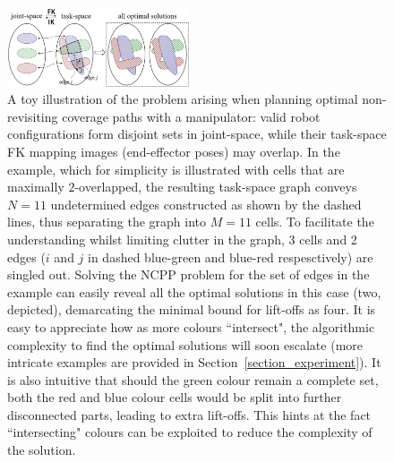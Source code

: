 \documentclass[conference]{IEEEtran}
\begin{document}
\begin{figure}[t]
\centering
\includegraphics[width = 0.48\textwidth]{figures/mapping_2}
\caption{A toy illustration of the problem arising when planning optimal non-revisiting coverage paths with a manipulator: valid robot configurations form disjoint sets in joint-space, while their task-space FK mapping images (end-effector poses) may overlap. 
In the example, which for simplicity is illustrated with cells that are maximally $2$-overlapped, the resulting task-space graph 
conveys $N = 11$ undetermined edges constructed as shown by the dashed lines, thus separating the graph into $M = 11$ cells.
To facilitate the understanding whilst limiting clutter in the graph, 3 cells and 2 edges ($i$ and $j$ in dashed blue-green and blue-red respesctively) are singled out.
Solving the NCPP problem for the set of edges in the example can easily reveal all the optimal solutions in this case (two, depicted), demarcating the minimal bound for lift-offs as four. 
It is easy to appreciate how as more colours ``intersect", the algorithmic complexity to find the optimal solutions will soon escalate (more intricate examples are provided in Section~\ref{section_experiment}). 
It is also intuitive that should the green colour remain a complete set, both the red and blue colour cells would be split into further disconnected parts, leading to extra lift-offs. %
This hints at the fact ``intersecting" colours %
can be exploited to reduce the complexity of the solution.
}
\label{fig:mapping}
\end{figure}
\end{document}
